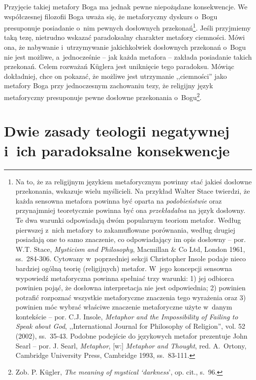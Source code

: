 Przyjęcie takiej metafory Boga ma jednak pewne niepożądane konsekwencje. We współczesnej filozofii Boga uważa się, że metaforyczny dyskurs o~Bogu presuponuje posiadanie o~nim pewnych dosłownych przekonań\footnote{Na to, że za religijnym językiem metaforycznym powinny stać jakieś dosłowne przekonania, wskazuje wielu myślicieli. Na przykład Walter Stace twierdzi, że każda sensowna metafora powinna być oparta na \textit{podobieństwie} oraz przynajmniej teoretycznie powinna być ona \textit{przekładalna} na język dosłowny. Te dwa warunki odpowiadają dwóm popularnym teoriom metafor. Według pierwszej z~nich metafory to zakamuflowane porównania, według drugiej posiadają one to samo znaczenie, co odpowiadający im opis dosłowny -- por. W.T. Stace, \textit{Mysticism and Philosophy}, Macmillan \& Co Ltd, London 1961, ss.~284-306. Cytowany w~poprzedniej sekcji Christopher Insole podaje nieco bardziej ogólną teorię (religijnych) metafor. W~jego koncepcji sensowna wypowiedź metaforyczna powinna spełniać trzy warunki: 1) jej odbiorca powinien pojąć, że dosłowna interpretacja nie jest odpowiednia; 2) powinien potrafić rozpoznać wszystkie metaforyczne znaczenia tego wyrażenia oraz 3) powinien móc wybrać właściwe znaczenie metaforyczne użyte w~danym kontekście -- por. C.J. Insole, \textit{Metaphor and the Impossibility of Failing to Speak about God}, ,,International Journal for Philosophy of Religion'', vol. 52 (2002), ss.~35-43. Podobne podejście do językowych metafor prezentuje John Searl -- por. J. Searl, \textit{Metaphor}, [w:] \textit{Metaphor and Thought}, red. A.~Ortony, Cambridge University Press, Cambridge 1993, ss.~83-111.}. Jeśli przyjmiemy taką tezę, nietrudno wskazać paradoksalny charakter metafory ciemności. Mówi ona, że nabywanie i~utrzymywanie jakichkolwiek dosłownych przekonań o~Bogu nie jest możliwe, a~jednocześnie -- jak każda metafora -- zakłada posiadanie takich przekonań. Celem rozważań Küglera jest uniknięcie tego paradoksu. Mówiąc dokładniej, chce on pokazać, że możliwe jest utrzymanie ,,ciemności'' jako metafory Boga przy jednoczesnym zachowaniu tezy, że religijny język metaforyczny presuponuje pewne dosłowne przekonania o~Bogu\footnote{Zob. P. Kügler, \textit{The meaning of mystical ‘darkness}', op. cit., s.~96.}.


\section{Dwie zasady teologii negatywnej i~ich paradoksalne konsekwencje}\label{sil-kug-zasady}

